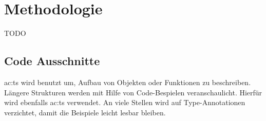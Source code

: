 \chapter{Methodologie}

TODO 

\section{Code Ausschnitte}

\acrlong{ac:ts} wird benutzt um, Aufbau von Objekten oder Funktionen zu beschreiben. Längere Strukturen werden mit Hilfe von Code-Bespielen veranschaulicht. Hierfür wird ebenfalls \acrlong{ac:ts} verwendet. An viele Stellen wird auf Type-Annotationen verzichtet, damit die Beispiele leicht lesbar bleiben.